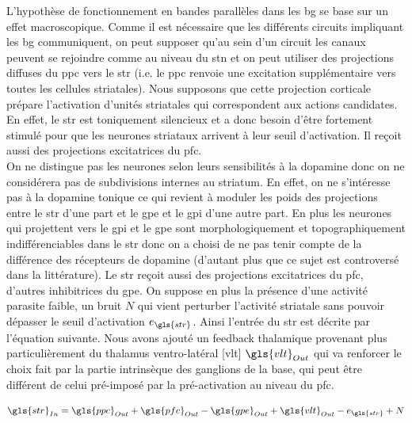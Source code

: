 L'hypothèse de fonctionnement en bandes parallèles dans les \gls{bg} se base sur un effet macroscopique. Comme il est nécessaire que les différents circuits impliquant les \gls{bg} communiquent, on peut supposer qu'au sein d'un circuit les canaux peuvent se rejoindre comme au niveau du \gls{stn} et on peut utiliser des projections diffuses du \gls{ppc} vers le \gls{str} (i.e. le \gls{ppc} renvoie une excitation supplémentaire vers toutes les cellules striatales). Nous supposons que cette projection corticale prépare l'activation d'unités striatales qui correspondent aux actions candidates. En effet, le \gls{str} est toniquement silencieux et a donc besoin d'être fortement stimulé pour que les neurones striataux arrivent à leur seuil d'activation. Il reçoit aussi des projections excitatrices du \gls{pfc}. \\ 

On ne distingue pas les neurones selon leurs sensibilités à la dopamine donc on ne considérera pas de subdivisions internes au striatum. En effet, on ne s'intéresse pas à la dopamine tonique ce qui revient à moduler les poids des projections entre le \gls{str} d'une part et le \gls{gpe} et le \gls{gpi} d'une autre part. En plus les neurones qui projettent vers le \gls{gpi} et le \gls{gpe} sont morphologiquement et topographiquement indifférenciables dans le \gls{str} donc on a choisi de ne pas tenir compte de la différence des récepteurs de dopamine \cite{Gerfen:1990} (d'autant plus que ce sujet est controversé dans la littérature). Le \gls{str} reçoit aussi des projections excitatrices du \gls{pfc}, d'autres inhibitrices du \gls{gpe}. On suppose en plus la présence d'une activité parasite faible, un bruit $N$  qui vient perturber l'activité striatale sans pouvoir dépasser le seuil d'activation $e_{\gls{str}} $. Ainsi l'entrée du \gls{str} est décrite par l'équation suivante. Nous avons ajouté un feedback thalamique provenant plus particulièrement du thalamus ventro-latéral [\gls{vlt}] ${\gls{vlt}}_{Out}$  qui va renforcer le choix fait par la partie intrinsèque des ganglions de la base, qui peut être différent de celui pré-imposé par la pré-activation au niveau du \gls{pfc}.\\

\begin{center}
\begin{equation} 
\gls{str}_{In}= {\gls{ppc}}_{Out}+{\gls{pfc}}_{Out}-{\gls{gpe}}_{Out}+{\gls{vlt}}_{Out}-e_{\gls{str}}+N
\end{equation}
\label{eqstr}
\end{center}

